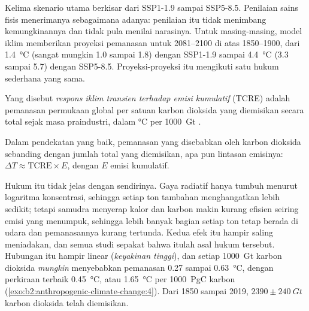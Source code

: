 Kelima skenario utama berkisar dari SSP1-1.9 sampai SSP5-8.5. Penilaian sains fisis menerimanya sebagaimana
adanya: penilaian itu tidak menimbang kemungkinannya dan tidak pula menilai narasinya. Untuk masing-masing, model iklim
memberikan proyeksi pemanasan untuk 2081--2100 di atas 1850--1900, dari \qty{1.4}{\celsius} (sangat mungkin 1.0
sampai 1.8) dengan SSP1-1.9 sampai \qty{4.4}{\celsius} (3.3 sampai 5.7) dengan SSP5-8.5. Proyeksi-proyeksi itu mengikuti
satu hukum sederhana yang sama.

\begin{definition}\label{def:b2:anthropogenic-climate-change:tcre}
Yang disebut \emph{respons iklim transien terhadap emisi  kumulatif}
(TCRE) adalah pemanasan permukaan global per satuan karbon
dioksida yang diemisikan secara total sejak masa praindustri, dalam \unit{\celsius} per
\qty{1000}{Gt} .
\end{definition}

\begin{proposition}\label{prop:b2:anthropogenic-climate-change:tcre}
Dalam pendekatan yang baik, pemanasan yang disebabkan oleh karbon dioksida sebanding dengan jumlah total yang diemisikan,
apa pun lintasan emisinya: $\Delta T \approx \text{TCRE} \times E$, dengan $E$ emisi
kumulatif.
\end{proposition}
\admitted

Hukum itu tidak jelas dengan sendirinya. Gaya radiatif hanya tumbuh menurut logaritma konsentrasi, sehingga setiap
ton tambahan menghangatkan lebih sedikit; tetapi samudra menyerap kalor dan karbon makin kurang efisien seiring
emisi yang menumpuk, sehingga lebih banyak bagian setiap ton tetap berada di udara dan pemanasannya kurang tertunda. Kedua
efek itu hampir saling meniadakan, dan semua studi sepakat bahwa itulah asal hukum tersebut. Hubungan itu
hampir linear (\emph{keyakinan tinggi}), dan setiap \qty{1000}{Gt} karbon dioksida \emph{mungkin} menyebabkan
pemanasan 0.27 sampai \qty{0.63}{\celsius}, dengan perkiraan terbaik \qty{0.45}{\celsius}, atau \qty{1.65}{\celsius}
per \qty{1000}{PgC} karbon (\cref{exo:b2:anthropogenic-climate-change:4}). Dari 1850 sampai 2019,
$\num{2390} \pm \qty{240}{Gt}$ karbon dioksida telah diemisikan.

